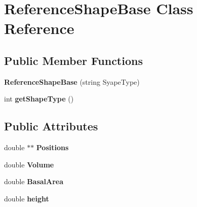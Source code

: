 \hypertarget{classReferenceShapeBase}{}\section{Reference\+Shape\+Base Class Reference}
\label{classReferenceShapeBase}
\subsection*{Public Member Functions}
\begin{DoxyCompactItemize}
\item 
\hypertarget{classReferenceShapeBase_af869879b4c059d8946008f50055f49a0}{}{\bfseries Reference\+Shape\+Base} (string Syape\+Type)\label{classReferenceShapeBase_af869879b4c059d8946008f50055f49a0}

\item 
\hypertarget{classReferenceShapeBase_a88841b8e87bfec65991d55dfe565ceb7}{}int {\bfseries get\+Shape\+Type} ()\label{classReferenceShapeBase_a88841b8e87bfec65991d55dfe565ceb7}

\end{DoxyCompactItemize}
\subsection*{Public Attributes}
\begin{DoxyCompactItemize}
\item 
\hypertarget{classReferenceShapeBase_a745e71ff73ef758708f39a4b3b1be4d1}{}double $\ast$$\ast$ {\bfseries Positions}\label{classReferenceShapeBase_a745e71ff73ef758708f39a4b3b1be4d1}

\item 
\hypertarget{classReferenceShapeBase_a12d2d0c2511f4f1357360ff61910ac02}{}double {\bfseries Volume}\label{classReferenceShapeBase_a12d2d0c2511f4f1357360ff61910ac02}

\item 
\hypertarget{classReferenceShapeBase_a214b89b970efa7a290dbe1533cf237ea}{}double {\bfseries Basal\+Area}\label{classReferenceShapeBase_a214b89b970efa7a290dbe1533cf237ea}

\item 
\hypertarget{classReferenceShapeBase_a76ac694d1b1276f6847bee3c3efa84b0}{}double {\bfseries height}\label{classReferenceShapeBase_a76ac694d1b1276f6847bee3c3efa84b0}

\end{DoxyCompactItemize}
